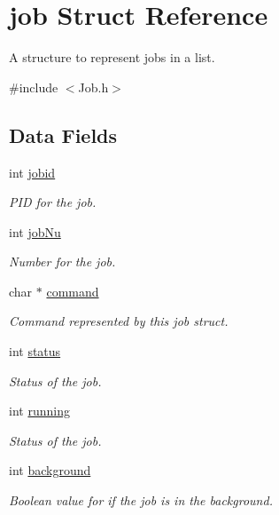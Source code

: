 \hypertarget{structjob}{
\section{job Struct Reference}
\label{structjob}
}


A structure to represent jobs in a list.  




{\ttfamily \#include $<$Job.h$>$}

\subsection*{Data Fields}
\begin{Indent}{\bf }\par
{\em \label{_amgrpd41d8cd98f00b204e9800998ecf8427e}
 }\begin{DoxyCompactItemize}
\item 
int \hyperlink{structjob_afe3a32adf804677267c68bb127a00cca}{jobid}
\begin{DoxyCompactList}\small\item\em PID for the job. \item\end{DoxyCompactList}\item 
int \hyperlink{structjob_a18569aada40953b60f0bd33c5792b249}{jobNu}
\begin{DoxyCompactList}\small\item\em Number for the job. \item\end{DoxyCompactList}\item 
char $\ast$ \hyperlink{structjob_aeac80b69b63321f8d60bee5b13d69858}{command}
\begin{DoxyCompactList}\small\item\em Command represented by this job struct. \item\end{DoxyCompactList}\item 
int \hyperlink{structjob_a610b66cc483fbb6c2ba016d1dc62c9a0}{status}
\begin{DoxyCompactList}\small\item\em Status of the job. \item\end{DoxyCompactList}\item 
int \hyperlink{structjob_a88d7e67d62586ecfcccca13251f62f98}{running}
\begin{DoxyCompactList}\small\item\em Status of the job. \item\end{DoxyCompactList}\item 
int \hyperlink{structjob_a1bc2e887b4110bd0a380cb06ab2f7cbf}{background}
\begin{DoxyCompactList}\small\item\em Boolean value for if the job is in the background. \item\end{DoxyCompactList}\end{DoxyCompactItemize}
\end{Indent}


